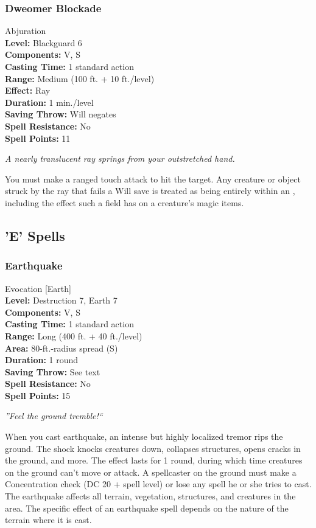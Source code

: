\subsubsection{Dweomer Blockade}
\label{Spell:DweomerBlockade}
Abjuration
\\ \textbf{Level:} Blackguard 6
\\ \textbf{Components:} V, S
\\ \textbf{Casting Time:} 1 standard action
\\ \textbf{Range:} Medium (100 ft. + 10 ft./level)
\\ \textbf{Effect:} Ray
\\ \textbf{Duration:} 1 min./level
\\ \textbf{Saving Throw:} Will negates
\\ \textbf{Spell Resistance:} No
\\ \textbf{Spell Points:} 11

\emph{A nearly translucent ray springs from your outstretched hand.} 

You must make a ranged touch attack to hit the target. 
Any creature or object struck by the ray that fails a Will save is treated as being entirely within an , including the effect such a field has on a creature's magic items.

\subsection{'E' Spells}
\subsubsection{Earthquake}
\label{Spell:Earthquake}
Evocation [Earth]
\\ \textbf{Level:} Destruction 7, Earth 7
\\ \textbf{Components:} V, S
\\ \textbf{Casting Time:} 1 standard action
\\ \textbf{Range:} Long (400 ft. + 40 ft./level)
\\ \textbf{Area:} 80-ft.-radius spread (S)
\\ \textbf{Duration:} 1 round
\\ \textbf{Saving Throw:} See text
\\ \textbf{Spell Resistance:} No
\\ \textbf{Spell Points:} 15

\emph{''Feel the ground tremble!``}

When you cast earthquake, an intense but highly localized tremor rips the ground. 
The shock knocks creatures down, collapses structures, opens cracks in the ground, and more. 
The effect lasts for 1 round, during which time creatures on the ground can't move or attack. 
A spellcaster on the ground must make a Concentration check (DC 20 + spell level) or lose any spell he or she tries to cast. 
The earthquake affects all terrain, vegetation, structures, and creatures in the area. 
The specific effect of an earthquake spell depends on the nature of the terrain where it is cast.

